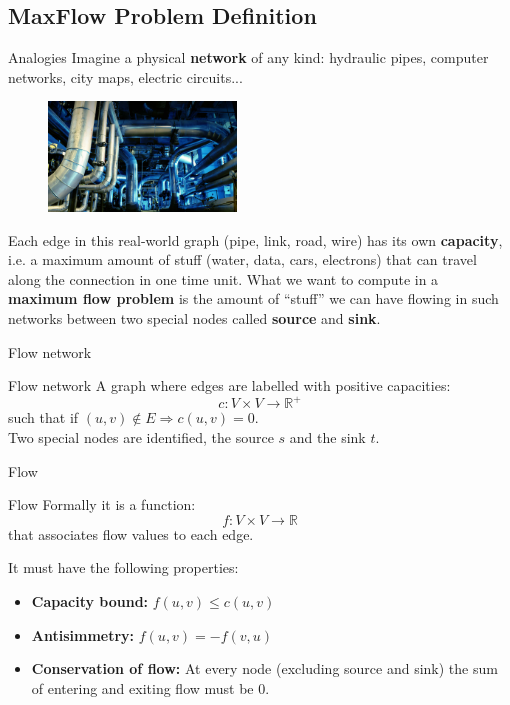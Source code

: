 \documentclass{beamer}
\begin{document}
    \subsection{MaxFlow Problem Definition}
    \begin{frame}{Analogies}
        Imagine a physical \textbf{network} of any kind: hydraulic pipes,
        computer networks, city maps, electric circuits...
        \begin{figure}[!htb]
            \includegraphics[width=50mm]{pipes}
        \end{figure}
        Each edge in this real-world graph (pipe, link, road, wire) has its own \textbf{capacity},
        i.e. a maximum amount of stuff (water, data, cars, electrons) that can travel
        along the connection in one time unit.
        What we want to compute in a \textbf{maximum flow problem} is the amount of ``stuff''
        we can have flowing in such networks between two special nodes called \textbf{source} and
        \textbf{sink}.
    \end{frame}

    \begin{frame}{Flow network}
        \begin{block}{Flow network}
            A graph where edges are labelled with positive capacities:
            $$c:V\times V\rightarrow \mathbb{R}^+$$
            such that if $(u,v) \notin E \Rightarrow c(u,v) = 0$.\\
            Two special nodes are identified, the source $s$ and the sink $t$.
        \end{block}
    \end{frame}

    \begin{frame}{Flow}
        \begin{block}{Flow}
            Formally it is a function:
            $$f:V\times V \rightarrow \mathbb{R}$$
            that associates flow values to each edge.
        \end{block}
        It must have the following properties:
        \begin{itemize}
            \item \textbf{Capacity bound:} $f(u,v)\leq c(u,v)$
            \item \textbf{Antisimmetry:} $f(u,v) = -f(v,u)$
            \item \textbf{Conservation of flow:} At every node (excluding source and sink)
                    the sum of entering and exiting flow must be 0.
        \end{itemize}
    \end{frame}
\end{document}
